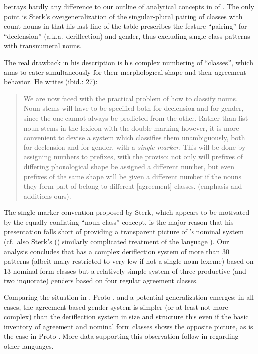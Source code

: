 \documentclass[output=collectionpaper]{langsci/langscibook}
\begin{document}
\largerpage
{} betrays hardly any difference to our outline of analytical concepts in  of . The only point is Sterk's overgeneralization of the singular-plural pairing of classes with count nouns in that his last line of the table prescribes the feature ``pairing'' for ``declension'' (a.k.a.\ deriflection) and gender, thus excluding single class patterns with transnumeral nouns.

The real drawback in his description is his complex numbering of ``classes'', which aims to cater simultaneously for their morphological shape and their agreement behavior. He writes (ibid.: 27):


\begin{quote}
We are now faced with the practical problem of how to classify  nouns. Noun stems will have to be specified both for declension and for gender, since the one cannot always be predicted from the other. Rather than list noun stems in the lexicon with the double marking however, it is more convenient to devise a system which classifies them unambiguously, both for declension and for gender, with a \emph{single marker}. This will be done by assigning numbers to prefixes, with the proviso: not only will prefixes of differing phonological shape be assigned a different number, but even prefixes of the same shape will be given a different number if the nouns they form part of belong to different [agreement] classes. (emphasis and additions ours).
\end{quote}


The single-marker convention proposed by Sterk, which appears to be motivated by the equally conflating ``noun class'' concept, is the major reason that his presentation falls short of providing a transparent picture of 's nominal system (cf.\ also Sterk's (\citeyear{Sterk1976}) similarly complicated treatment of the  language ). Our analysis concludes that  has a complex deriflection system of more than 30 patterns (albeit many restricted to very few if not a single noun lexeme) based on 13 nominal form classes but a relatively simple system of three productive (and two inquorate) genders based on four regular agreement classes.

Comparing the situation in , Proto-, and  a potential generalization emerges: in all cases, the agreement-based gender system is simpler (or at least not more complex) than the deriflection system in size and structure \textendash{} this even if the basic inventory of agreement and nominal form classes shows the opposite picture, as is the case in Proto-. More data supporting this observation follow in  regarding other  languages.
\end{document}
